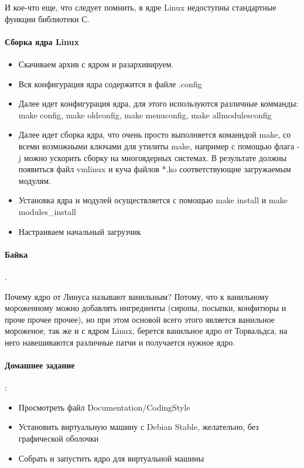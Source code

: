 И кое-что еще, что следует помнить, в ядре Linux недоступны стандартные функции библиотеки С.

\paragraph{Сборка ядра Linux}

\begin{itemize}
\item Скачиваем архив с ядром и разархивируем.

\item Вся конфигурация ядра содержится в файле .config

\item Далее идет конфигурация ядра, для этого используются различные комманды: make config, make oldconfig, make menuconfig,
make allmodulesconfig

\item Далее идет сборка ядра, что очень просто выполняется команндой make, со всеми возможными ключами для утилиты make, например с
помощью флага -j можно ускорить сборку на многоядерных системах. В результате должны появиться файл vmlinux и куча файлов *.ko
соответствующие загружаемым модулям.

\item Установка ядра и модулей осуществляется с помощью make install и make modules\_install

\item Настраиваем начальный загрузчик
\end{itemize}

\paragraph{Байка}.

Почему ядро от Линуса называют ванильным? Потому, что к ванильному мороженному можно добавлять ингредиенты (сиропы, посыпки,
конфитюры и проче прочее прочее), но при этом основой всего этого является ванильное мороженое, так же и с ядром Linux, берется
ванильное ядро от Торвальдса, на него навешиваются различные патчи и получается нужное ядро.

\paragraph{Домашнее задание}:

\begin{itemize}
\item Просмотреть файл Documentation/CodingStyle

\item Установить виртуальную машину с Debian Stable, желательно, без графической оболочки

\item Собрать и запустить ядро для виртуальной машины
\end{itemize}